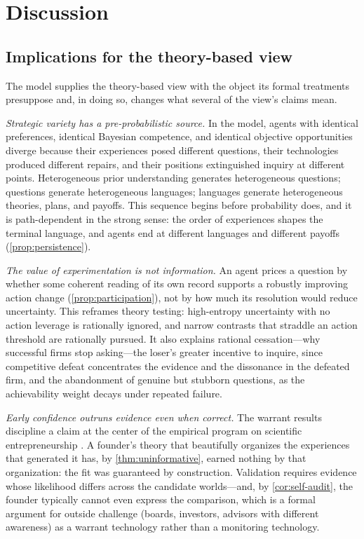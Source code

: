 \documentclass[11pt]{article}
\theoremstyle{definition}
\begin{document}
\section{Discussion}
\label{sec:discussion}

\subsection{Implications for the theory-based view}

The model supplies the theory-based view with the object its formal treatments presuppose and, in doing so, changes what several of the view's claims mean.

\emph{Strategic variety has a pre-probabilistic source.}
In the model, agents with identical preferences, identical Bayesian competence, and identical objective opportunities diverge because their experiences posed different questions, their technologies produced different repairs, and their positions extinguished inquiry at different points.
Heterogeneous prior understanding generates heterogeneous questions; questions generate heterogeneous languages; languages generate heterogeneous theories, plans, and payoffs.
This sequence begins before probability does, and it is path-dependent in the strong sense: the order of experiences shapes the terminal language, and agents end at different languages and different payoffs (\cref{prop:persistence}).

\emph{The value of experimentation is not information.}
An agent prices a question by whether some coherent reading of its own record supports a robustly improving action change (\cref{prop:participation}), not by how much its resolution would reduce uncertainty.
This reframes theory testing: high-entropy uncertainty with no action leverage is rationally ignored, and narrow contrasts that straddle an action threshold are rationally pursued.
It also explains rational cessation---why successful firms stop asking---the loser's greater incentive to inquire, since competitive defeat concentrates the evidence and the dissonance in the defeated firm, and the abandonment of genuine but stubborn questions, as the achievability weight decays under repeated failure.

\emph{Early confidence outruns evidence even when correct.}
The warrant results discipline a claim at the center of the empirical program on scientific entrepreneurship \citep{CamuffoEtAl2020,ZellwegerZenger2023}.
A founder's theory that beautifully organizes the experiences that generated it has, by \cref{thm:uninformative}, earned nothing by that organization: the fit was guaranteed by construction.
Validation requires evidence whose likelihood differs across the candidate worlds---and, by \cref{cor:self-audit}, the founder typically cannot even express the comparison, which is a formal argument for outside challenge (boards, investors, advisors with different awareness) as a warrant technology rather than a monitoring technology.
\end{document}
